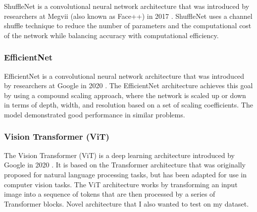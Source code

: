 \documentclass[reqno]{article}
\begin{document}
ShuffleNet is a convolutional neural network architecture that was introduced by researchers at Megvii (also known as Face++) in 2017 \citep{ma2018shufflenet}. ShuffleNet uses a channel shuffle technique to reduce the number of parameters and the computational cost of the network while balancing accuracy with computational efficiency.

\subsubsection{EfficientNet} 

EfficientNet is a convolutional neural network architecture that was introduced by researchers at Google in 2020 \cite{tan2020efficientnet, tan2021efficientnetv2}. The EfficientNet architecture achieves this goal by using a compound scaling approach, where the network is scaled up or down in terms of depth, width, and resolution based on a set of scaling coefficients. The model demonstrated good performance in similar problems.

\subsubsection{Vision Transformer (ViT) }

The Vision Transformer (ViT) is a deep learning architecture introduced by Google in 2020 \citep{dosovitskiy2021image}. It is based on the Transformer architecture that was originally proposed for natural language processing tasks, but has been adapted for use in computer vision tasks. The ViT architecture works by transforming an input image into a sequence of tokens that are then processed by a series of Transformer blocks. Novel architecture that I also wanted to test on my dataset.
\end{document}
